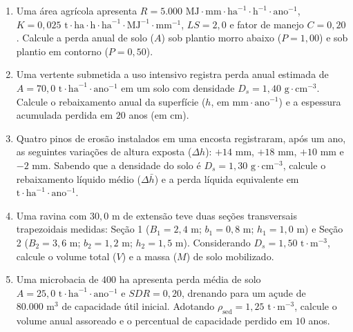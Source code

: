 \begin{enumerate}[leftmargin=1.8em, itemsep=6pt, resume]
  \item Uma área agrícola apresenta $R = 5.000\text{ MJ}\cdot\text{mm}\cdot\text{ha}^{-1}\cdot\text{h}^{-1}\cdot\text{ano}^{-1}$, $K = 0{,}025\text{ t}\cdot\text{ha}\cdot\text{h}\cdot\text{ha}^{-1}\cdot\text{MJ}^{-1}\cdot\text{mm}^{-1}$, $LS = 2{,}0$ e fator de manejo $C = 0{,}20$. Calcule a perda anual de solo ($A$) sob plantio morro abaixo ($P = 1{,}00$) e sob plantio em contorno ($P = 0{,}50$).
  \espacoResolucao[2.2cm]

  \item Uma vertente submetida a uso intensivo registra perda anual estimada de $A = 70{,}0\text{ t}\cdot\text{ha}^{-1}\cdot\text{ano}^{-1}$ em um solo com densidade $D_s = 1{,}40\text{ g}\cdot\text{cm}^{-3}$. Calcule o rebaixamento anual da superfície ($h$, em $\text{mm}\cdot\text{ano}^{-1}$) e a espessura acumulada perdida em $20$ anos (em $\text{cm}$).
  \espacoResolucao[2.2cm]

  \item Quatro pinos de erosão instalados em uma encosta registraram, após um ano, as seguintes variações de altura exposta ($\Delta h$): $+14\text{ mm}$, $+18\text{ mm}$, $+10\text{ mm}$ e $-2\text{ mm}$. Sabendo que a densidade do solo é $D_s = 1{,}30\text{ g}\cdot\text{cm}^{-3}$, calcule o rebaixamento líquido médio ($\Delta \bar{h}$) e a perda líquida equivalente em $\text{t}\cdot\text{ha}^{-1}\cdot\text{ano}^{-1}$.
  \espacoResolucao[2.2cm]

  \item Uma ravina com $30{,}0\text{ m}$ de extensão teve duas seções transversais trapezoidais medidas: Seção 1 ($B_1 = 2{,}4\text{ m}$; $b_1 = 0{,}8\text{ m}$; $h_1 = 1{,}0\text{ m}$) e Seção 2 ($B_2 = 3{,}6\text{ m}$; $b_2 = 1{,}2\text{ m}$; $h_2 = 1{,}5\text{ m}$). Considerando $D_s = 1{,}50\text{ t}\cdot\text{m}^{-3}$, calcule o volume total ($V$) e a massa ($M$) de solo mobilizado.
  \espacoResolucao[2.2cm]

  \item Uma microbacia de $400\text{ ha}$ apresenta perda média de solo $A = 25{,}0\text{ t}\cdot\text{ha}^{-1}\cdot\text{ano}^{-1}$ e $SDR = 0{,}20$, drenando para um açude de $80.000\text{ m}^3$ de capacidade útil inicial. Adotando $\rho_{\text{sed}} = 1{,}25\text{ t}\cdot\text{m}^{-3}$, calcule o volume anual assoreado e o percentual de capacidade perdido em $10$ anos.
  \espacoResolucao[2.2cm]
\end{enumerate}

